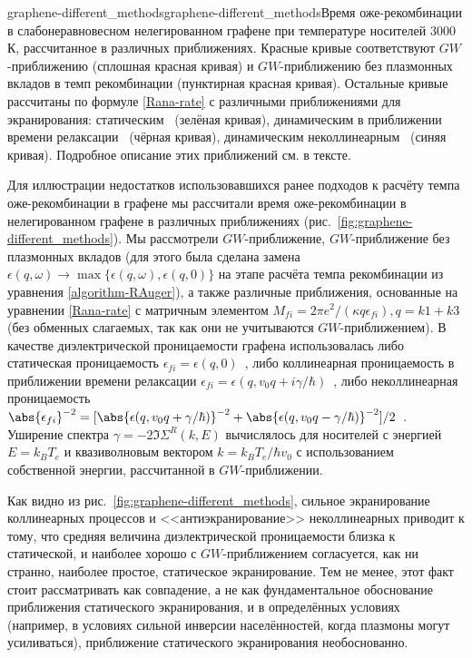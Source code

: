 \begin{narrowfig}{graphene-different_methods}{graphene-different_methods}Время оже-рекомбинации в слабонеравновесном нелегированном графене при температуре носителей 3000 К, рассчитанное в различных приближениях. Красные кривые соответствуют $GW$-приближению (сплошная красная кривая) и $GW$-приближению без плазмонных вкладов в темп рекомбинации (пунктирная красная кривая). Остальные кривые рассчитаны по формуле \eqref{Rana-rate} с различными приближениями для экранирования: статическим~\cite{Rana-Auger} (зелёная кривая), динамическим в приближении времени релаксации~\cite{Malic-dynamic} (чёрная кривая), динамическим неколлинеарным~\cite{Tomadin-theory} (синяя кривая). Подробное описание этих приближений см. в тексте.
\end{narrowfig}

Для иллюстрации недостатков использовавшихся ранее подходов к расчёту темпа оже-рекомбинации в графене мы рассчитали время оже-рекомбинации в нелегированном графене в различных приближениях (рис.~\ref{fig:graphene-different_methods}). Мы рассмотрели $GW$-приближение, $GW$-приближение без плазмонных вкладов (для этого была сделана замена $\epsilon(q,\omega) \rightarrow \max\{\epsilon(q,\omega),\epsilon(q,0)\}$ на этапе расчёта темпа рекомбинации из уравнения \eqref{algorithm-RAuger}), а также различные приближения, основанные на уравнении \eqref{Rana-rate} с матричным элементом $M_{fi} = 2\pi e^2/(\kappa q \epsilon_{fi}), q = k1+k3$ (без обменных слагаемых, так как они не учитываются $GW$-приближением). В качестве диэлектрической проницаемости графена использовалась либо статическая проницаемость $\epsilon_{fi} = \epsilon(q,0)$~\cite{Rana-Auger}, либо коллинеарная проницаемость в приближении времени релаксации $\epsilon_{fi} = \epsilon(q,v_0 q + i\gamma/\hbar)$~\cite{Malic-dynamic}, либо неколлинеарная проницаемость $\abs{\epsilon_{fi}}^{-2} = [\abs{\epsilon(q,v_0 q + \gamma/\hbar)}^{-2} + \abs{\epsilon(q,v_0 q - \gamma/\hbar)}^{-2}]/2$~\cite{Tomadin-theory}. Уширение спектра $\gamma  = -2\Im \Sigma^R(k,E)$ вычислялось для носителей с энергией $E = k_B T_e$ и квазиволновым вектором $k = k_B T_e/\hbar v_0$ с использованием собственной энергии, рассчитанной в $GW$-приближении.

Как видно из рис.~\ref{fig:graphene-different_methods}, сильное экранирование коллинеарных процессов и <<антиэкранирование>> неколлинеарных приводит к тому, что средняя величина диэлектрической проницаемости близка к статической, и наиболее хорошо с $GW$-приближением согласуется, как ни странно, наиболее простое, статическое экранирование. Тем не менее, этот факт стоит рассматривать как совпадение, а не как фундаментальное обоснование приближения статического экранирования, и в определённых условиях (например, в условиях сильной инверсии населённостей, когда плазмоны могут усиливаться), приближение статического экранирования необоснованно.

